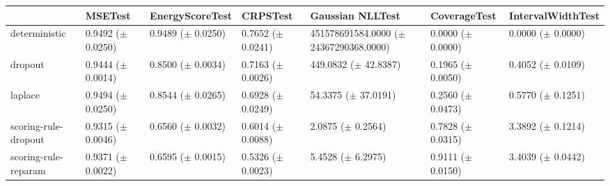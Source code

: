 \begin{tabular}{lllllll}
\toprule
 & MSETest & EnergyScoreTest & CRPSTest & Gaussian NLLTest & CoverageTest & IntervalWidthTest \\
\midrule
deterministic & \makecell{0.9492 \\ ($\pm$ 0.0250)} & \makecell{0.9489 \\ ($\pm$ 0.0250)} & \makecell{0.7652 \\ ($\pm$ 0.0241)} & \makecell{451578691584.0000 \\ ($\pm$ 24367290368.0000)} & \makecell{0.0000 \\ ($\pm$ 0.0000)} & \makecell{0.0000 \\ ($\pm$ 0.0000)} \\
dropout & \makecell{0.9444 \\ ($\pm$ 0.0014)} & \makecell{0.8500 \\ ($\pm$ 0.0034)} & \makecell{0.7163 \\ ($\pm$ 0.0026)} & \makecell{449.0832 \\ ($\pm$ 42.8387)} & \makecell{0.1965 \\ ($\pm$ 0.0050)} & \makecell{0.4052 \\ ($\pm$ 0.0109)} \\
laplace & \makecell{0.9494 \\ ($\pm$ 0.0250)} & \makecell{0.8544 \\ ($\pm$ 0.0265)} & \makecell{0.6928 \\ ($\pm$ 0.0249)} & \makecell{54.3375 \\ ($\pm$ 37.0191)} & \makecell{0.2560 \\ ($\pm$ 0.0473)} & \makecell{0.5770 \\ ($\pm$ 0.1251)} \\
scoring-rule-dropout & \makecell{0.9315 \\ ($\pm$ 0.0046)} & \makecell{0.6560 \\ ($\pm$ 0.0032)} & \makecell{0.6014 \\ ($\pm$ 0.0088)} & \makecell{2.0875 \\ ($\pm$ 0.2564)} & \makecell{0.7828 \\ ($\pm$ 0.0315)} & \makecell{3.3892 \\ ($\pm$ 0.1214)} \\
scoring-rule-reparam & \makecell{0.9371 \\ ($\pm$ 0.0022)} & \makecell{0.6595 \\ ($\pm$ 0.0015)} & \makecell{0.5326 \\ ($\pm$ 0.0023)} & \makecell{5.4528 \\ ($\pm$ 6.2975)} & \makecell{0.9111 \\ ($\pm$ 0.0150)} & \makecell{3.4039 \\ ($\pm$ 0.0442)} \\
\bottomrule
\end{tabular}

